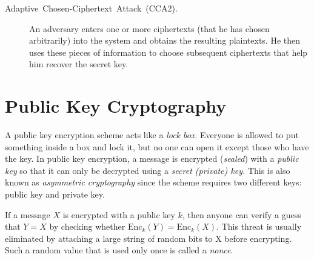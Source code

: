 \documentclass[10pt]{article}
\theoremstyle{plain}
\begin{document}
\begin{description}
	\item [{Adaptive~Chosen-Ciphertext~Attack~(CCA2).}] An adversary enters
	one or more ciphertexts (that he has chosen arbitrarily) into the
	system and obtains the resulting plaintexts. He then uses these pieces
	of information to choose subsequent ciphertexts that help him recover
	the secret key.
\end{description}

\section{Public Key Cryptography \label{sec:Public-Key-Cryptography}}

A public key encryption scheme acts like a \emph{lock box}. Everyone
is allowed to put something inside a box and lock it, but no one can
open it except those who have the key. In public key encryption, a
message is encrypted (\emph{sealed}) with a \emph{public key} so that
it can only be decrypted using a \emph{secret (private) key.} This
is also known as \emph{asymmetric cryptography} since the scheme requires
two different keys: public key and private key.

If a message $X$ is encrypted with a public key $k$, then anyone
can verify a guess that $Y=X$ by checking whether $\text{Enc}_{k}(Y)=\text{Enc}_{k}(X)$.
This threat is usually eliminated by attaching a large string of random
bits to X before encrypting. Such a random value that is used only
once is called a \emph{nonce}.
\end{document}
